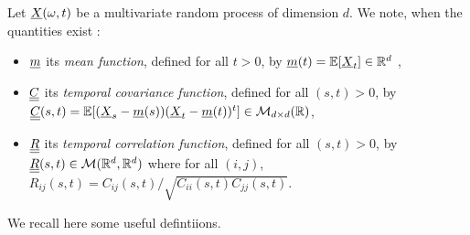\renewcommand{\filename}{docUC_StocProc_NormalIntro.tex}
\renewcommand{\filetitle}{Intro}







Let ${\underline{X}}(\omega,t)$ be a multivariate random process  of dimension $d$.  We note, when the quantities exist :
\begin{itemize}
\item  ${\underline{m}}$ its \emph{mean function},  defined for all $t>0$, by ${\underline{m}}(t)=\mathbb{E}[{\underline{X}}_t] \in \mathbb{R}^d$ , 
\item ${\underline{\underline{C}}}$ its \emph{temporal covariance function},  defined for all $(s,t)>0$, by ${\underline{\underline{C}}}(s, t)=\mathbb{E}[({\underline{X}}_s-{\underline{m}}(s))({\underline{X}}_t-{\underline{m}}(t))^t] \in  \mathcal{M}_{d \times d}(\mathbb{R})$,
\item  ${\underline{\underline{R}}}$ its \emph{temporal correlation function}, defined for all $(s,t)>0$, by ${\underline{\underline{R}}}(s, t)  \in  \mathcal{M}(\mathbb{R}^d,\mathbb{R}^d)$ where for all $(i,j)$, $R_{ij}(s, t)=C_{ij}(s, t)/\sqrt{C_{ii}(s, t)C_{jj}(s,t)}$.
\end{itemize}

We recall here some useful defintiions.\\

